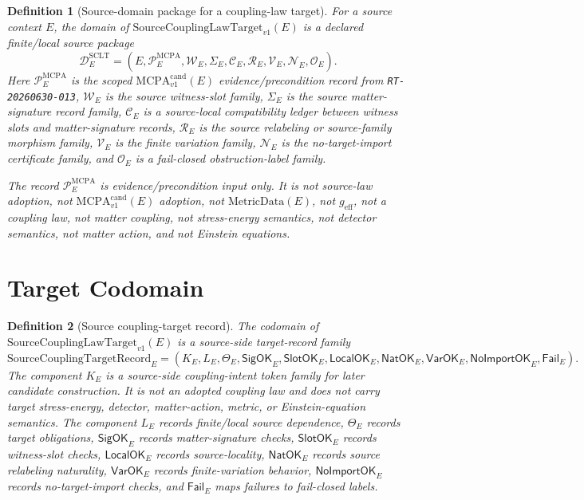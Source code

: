 \documentclass[11pt]{article}
\newcommand{\MetricData}{\mathrm{MetricData}}
\newcommand{\geff}{g_{\mathrm{eff}}}
\newcommand{\MCPA}{\mathrm{MCPA}^{\mathrm{cand}}_{v1}}
\newcommand{\SourceCoupTarget}{\mathrm{SourceCouplingLawTarget}_{v1}}
\newcommand{\SourceCoupRec}{\mathrm{SourceCouplingTargetRecord}}
\newtheorem{definition}{Definition}
\begin{document}
\begin{definition}[Source-domain package for a coupling-law target]
For a source context \(E\), the domain of \(\SourceCoupTarget(E)\) is a
declared finite/local source package
\[
  \mathcal{D}^{\mathrm{SCLT}}_E =
  (E,\mathcal{P}^{\mathrm{MCPA}}_E,\mathcal{W}_E,\Sigma_E,
  \mathcal{C}_E,\mathcal{R}_E,\mathcal{V}_E,\mathcal{N}_E,\mathcal{O}_E).
\]
Here \(\mathcal{P}^{\mathrm{MCPA}}_E\) is the scoped
\(\MCPA(E)\) evidence/precondition record from \texttt{RT-20260630-013},
\(\mathcal{W}_E\) is the source witness-slot family, \(\Sigma_E\) is the
source matter-signature record family, \(\mathcal{C}_E\) is a source-local
compatibility ledger between witness slots and matter-signature records,
\(\mathcal{R}_E\) is the source relabeling or source-family morphism family,
\(\mathcal{V}_E\) is the finite variation family, \(\mathcal{N}_E\) is the
no-target-import certificate family, and \(\mathcal{O}_E\) is a fail-closed
obstruction-label family.

The record \(\mathcal{P}^{\mathrm{MCPA}}_E\) is evidence/precondition input
only. It is not source-law adoption, not \(\MCPA(E)\) adoption, not
\(\MetricData(E)\), not \(\geff\), not a coupling law, not matter coupling,
not stress-energy semantics, not detector semantics, not matter action, and
not Einstein equations.
\end{definition}

\section{Target Codomain}

\begin{definition}[Source coupling-target record]
The codomain of \(\SourceCoupTarget(E)\) is a source-side target-record
family
\[
  \SourceCoupRec_E =
  (K_E,L_E,\Theta_E,\mathsf{SigOK}_E,\mathsf{SlotOK}_E,
  \mathsf{LocalOK}_E,\mathsf{NatOK}_E,\mathsf{VarOK}_E,
  \mathsf{NoImportOK}_E,\mathsf{Fail}_E).
\]
The component \(K_E\) is a source-side coupling-intent token family for later
candidate construction. It is not an adopted coupling law and does not carry
target stress-energy, detector, matter-action, metric, or Einstein-equation
semantics. The component \(L_E\) records finite/local source dependence,
\(\Theta_E\) records target obligations, \(\mathsf{SigOK}_E\) records
matter-signature checks, \(\mathsf{SlotOK}_E\) records witness-slot checks,
\(\mathsf{LocalOK}_E\) records source-locality, \(\mathsf{NatOK}_E\) records
source relabeling naturality, \(\mathsf{VarOK}_E\) records finite-variation
behavior, \(\mathsf{NoImportOK}_E\) records no-target-import checks, and
\(\mathsf{Fail}_E\) maps failures to fail-closed labels.
\end{definition}
\end{document}
